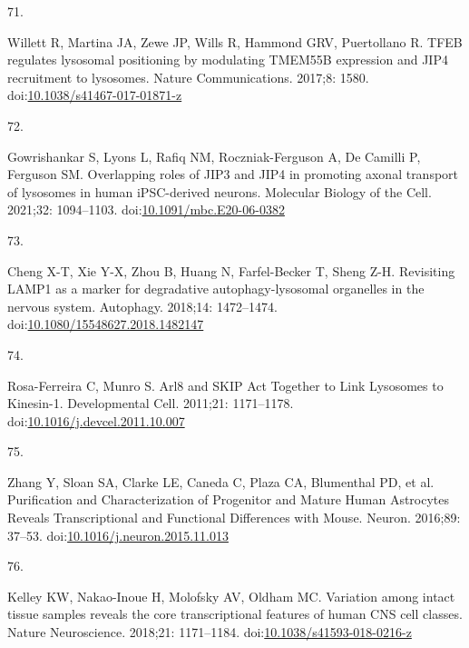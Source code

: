 \documentclass[
  12pt,
  a4paper,
]{book}
\newlength{\cslhangindent}
\newlength{\csllabelwidth}
\newlength{\cslentryspacingunit} %
\newenvironment{CSLReferences}[2] %
 {%
  \setlength{\parindent}{0pt}
  \ifodd #1
  \let\oldpar\par
  \def\par{\hangindent=\cslhangindent\oldpar}
  \fi
  \setlength{\parskip}{#2\cslentryspacingunit}
 }%
 {}
\newcommand{\CSLLeftMargin}[1]{\parbox[t]{\csllabelwidth}{#1}}
\newcommand{\CSLRightInline}[1]{\parbox[t]{\linewidth - \csllabelwidth}{#1}\break}
\begin{document}
\begin{CSLReferences}{0}{0}
\leavevmode{}%
\CSLLeftMargin{71. }%
\CSLRightInline{Willett R, Martina JA, Zewe JP, Wills R, Hammond GRV, Puertollano R. {TFEB} regulates lysosomal positioning by modulating {TMEM55B} expression and {JIP4} recruitment to lysosomes. Nature Communications. 2017;8: 1580. doi:\href{https://doi.org/10.1038/s41467-017-01871-z}{10.1038/s41467-017-01871-z}}

\leavevmode{}%
\CSLLeftMargin{72. }%
\CSLRightInline{Gowrishankar S, Lyons L, Rafiq NM, Roczniak-Ferguson A, De Camilli P, Ferguson SM. Overlapping roles of {JIP3} and {JIP4} in promoting axonal transport of lysosomes in human {iPSC-derived} neurons. Molecular Biology of the Cell. 2021;32: 1094--1103. doi:\href{https://doi.org/10.1091/mbc.E20-06-0382}{10.1091/mbc.E20-06-0382}}

\leavevmode{}%
\CSLLeftMargin{73. }%
\CSLRightInline{Cheng X-T, Xie Y-X, Zhou B, Huang N, Farfel-Becker T, Sheng Z-H. Revisiting {LAMP1} as a marker for degradative autophagy-lysosomal organelles in the nervous system. Autophagy. 2018;14: 1472--1474. doi:\href{https://doi.org/10.1080/15548627.2018.1482147}{10.1080/15548627.2018.1482147}}

\leavevmode{}%
\CSLLeftMargin{74. }%
\CSLRightInline{Rosa-Ferreira C, Munro S. Arl8 and {SKIP Act Together} to {Link Lysosomes} to {Kinesin-1}. Developmental Cell. 2011;21: 1171--1178. doi:\href{https://doi.org/10.1016/j.devcel.2011.10.007}{10.1016/j.devcel.2011.10.007}}

\leavevmode{}%
\CSLLeftMargin{75. }%
\CSLRightInline{Zhang Y, Sloan SA, Clarke LE, Caneda C, Plaza CA, Blumenthal PD, et al. Purification and {Characterization} of {Progenitor} and {Mature Human Astrocytes Reveals Transcriptional} and {Functional Differences} with {Mouse}. Neuron. 2016;89: 37--53. doi:\href{https://doi.org/10.1016/j.neuron.2015.11.013}{10.1016/j.neuron.2015.11.013}}

\leavevmode{}%
\CSLLeftMargin{76. }%
\CSLRightInline{Kelley KW, Nakao-Inoue H, Molofsky AV, Oldham MC. Variation among intact tissue samples reveals the core transcriptional features of human {CNS} cell classes. Nature Neuroscience. 2018;21: 1171--1184. doi:\href{https://doi.org/10.1038/s41593-018-0216-z}{10.1038/s41593-018-0216-z}}


\end{CSLReferences}
\end{document}
